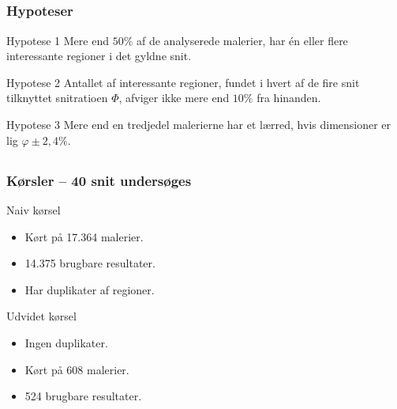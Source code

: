 \documentclass[xcolor=table]{beamer}
\begin{document}
\subsection*{}
\begin{frame}

    \frametitle{Hypoteser}

    \begin{block}{Hypotese 1}
        Mere end \alert{$50\%$} af de analyserede malerier, har én eller flere
        interessante regioner i det gyldne snit.
    \end{block}

    \begin{block}{Hypotese 2}
        Antallet af interessante regioner, fundet i hvert af de fire snit
        tilknyttet snitratioen $\varPhi$, afviger ikke mere end \alert{$10\%$} fra
        hinanden.
    \end{block}

    \begin{block}{Hypotese 3}
        Mere end \alert{en tredjedel} malerierne har et lærred, hvis
        dimensioner er lig $\varphi\pm2,4\%$.
    \end{block}

\end{frame}

\subsection*{}
\begin{frame}

    \frametitle{Kørsler -- 40 snit undersøges}

    \begin{block}{Naiv kørsel}
        \begin{itemize}
            \item Kørt på 17.364 malerier.
            \item 14.375 brugbare resultater.
            \item \alert{Har duplikater af regioner.}
        \end{itemize}
    \end{block}

    \begin{block}{Udvidet kørsel}
        \begin{itemize}
            \item Ingen duplikater.
            \item Kørt på 608 malerier.
            \item \alert{524 brugbare resultater.}
        \end{itemize}
    \end{block}

\end{frame}
\end{document}
